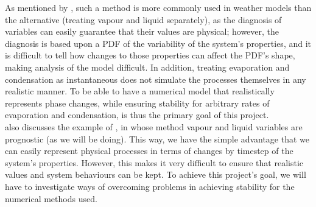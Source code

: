 \documentclass[11pt]{article}
\begin{document}
As mentioned by \citeauthor{Wilson2008}, such a method is more commonly used in weather models than the alternative (treating vapour and liquid separately), as the diagnosis of variables can easily guarantee that their values are physical; however, the diagnosis is based upon a PDF of the variability of the system's properties, and it is difficult to tell how changes to those properties can affect the PDF's shape, making analysis of the model difficult. In addition, treating evaporation and condensation as instantaneous does not simulate the processes themselves in any realistic manner. To be able to have a numerical model that realistically represents phase changes, while ensuring stability for arbitrary rates of evaporation and condensation, is thus the primary goal of this project. \\
\citeauthor{Wilson2008} also discusses the example of \citet{Tiedtke1993}, in whose method vapour and liquid variables are prognostic (as we will be doing). This way, we have the simple advantage that we can easily represent physical processes in terms of changes by timestep of the system's properties. However, this makes it very difficult to ensure that realistic values and system behaviours can be kept. To achieve this project's goal, we will have to investigate ways of overcoming problems in achieving stability for the numerical methods used.
\end{document}
